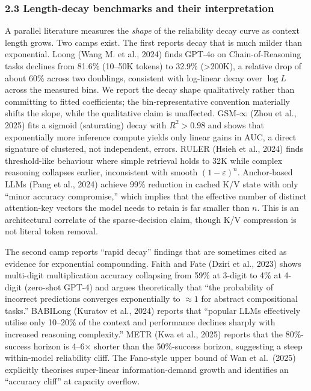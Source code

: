 \documentclass[
]{article}
\begin{document}
\subsubsection{2.3 Length-decay benchmarks and their
interpretation}\label{length-decay-benchmarks-and-their-interpretation}

A parallel literature measures the \emph{shape} of the reliability decay
curve as context length grows. Two camps exist. The first reports decay
that is much milder than exponential. Loong (Wang M. et al., 2024) finds
GPT-4o on Chain-of-Reasoning tasks declines from 81.6\% (10--50K tokens)
to 32.9\% (\textgreater200K), a relative drop of about 60\% across two
doublings, consistent with log-linear decay over \(\log L\) across the
measured bins. We report the decay shape qualitatively rather than
committing to fitted coefficients; the bin-representative convention
materially shifts the slope, while the qualitative claim is unaffected.
GSM-\(\infty\) (Zhou et al., 2025) fits a sigmoid (saturating) decay
with \(R^2 > 0.98\) and shows that exponentially more inference compute
yields only linear gains in AUC, a direct signature of clustered, not
independent, errors. RULER (Hsieh et al., 2024) finds threshold-like
behaviour where simple retrieval holds to 32K while complex reasoning
collapses earlier, inconsistent with smooth \((1-\varepsilon)^n\).
Anchor-based LLMs (Pang et al., 2024) achieve 99\% reduction in cached
K/V state with only ``minor accuracy compromise,'' which implies that
the effective number of distinct attention-key vectors the model needs
to retain is far smaller than \(n\). This is an architectural correlate
of the sparse-decision claim, though K/V compression is not literal
token removal.

The second camp reports ``rapid decay'' findings that are sometimes
cited as evidence for exponential compounding. Faith and Fate (Dziri et
al., 2023) shows multi-digit multiplication accuracy collapsing from
59\% at 3-digit to 4\% at 4-digit (zero-shot GPT-4) and argues
theoretically that ``the probability of incorrect predictions converges
exponentially to \(\approx 1\) for abstract compositional tasks.''
BABILong (Kuratov et al., 2024) reports that ``popular LLMs effectively
utilise only 10--20\% of the context and performance declines sharply
with increased reasoning complexity.'' METR (Kwa et al., 2025) reports
that the 80\%-success horizon is 4--6× shorter than the 50\%-success
horizon, suggesting a steep within-model reliability cliff. The
Fano-style upper bound of Wan et al.~(2025) explicitly theorises
super-linear information-demand growth and identifies an ``accuracy
cliff'' at capacity overflow.
\end{document}
